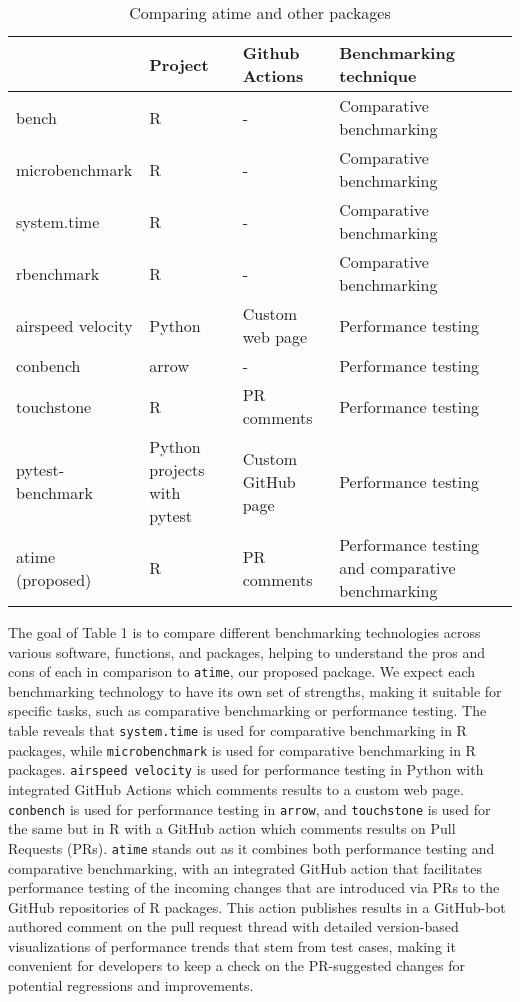 \begin{table}[H]
    \centering
        \caption{Comparing atime and other packages}
    \begin{tabular}{|m{2.6cm}|m{2cm}|m{3cm}|m{3cm}|m{4cm}|}
    \hline
         & Project & Github Actions & Benchmarking technique\\
\hline
bench & R  & - &  Comparative benchmarking \\

\hline
microbenchmark & R & - & Comparative benchmarking\\
\hline
system.time & R & - & Comparative benchmarking\\
\hline
rbenchmark & R & - & Comparative benchmarking\\
\hline
airspeed velocity & Python & Custom web page & Performance testing\\
\hline
conbench & arrow & - & Performance testing\\
\hline
touchstone & R & PR comments & Performance testing\\
\hline
pytest-benchmark & Python
projects with
pytest & Custom GitHub page & Performance testing\\
\hline
atime (proposed) & R & PR comments & Performance testing and comparative benchmarking\\
\hline
    \end{tabular}
    \label{tab:my_label}
\end{table}

\noindent The goal of Table 1 is to compare different benchmarking technologies across various software, functions, and packages, helping to understand the pros and cons of each in comparison to \texttt{atime}, our proposed package. We expect each benchmarking technology to have its own set of strengths, making it suitable for specific tasks, such as comparative benchmarking or performance testing. The table reveals that \texttt{system.time} is used for comparative benchmarking in R packages, while \texttt{microbenchmark} is used for comparative benchmarking in R packages. \texttt{airspeed velocity} is used for performance testing in Python with integrated GitHub Actions which comments results to a custom web page. \texttt{conbench} is used for performance testing in \texttt{arrow}, and \texttt{touchstone} is used for the same but in R with a GitHub action which comments results on Pull Requests (PRs). \texttt{atime} stands out as it combines both performance testing and comparative benchmarking, with an integrated GitHub action that facilitates performance testing of the incoming changes that are introduced via PRs to the GitHub repositories of R packages. This action publishes results in a GitHub-bot authored comment on the pull request thread with detailed version-based visualizations of performance trends that stem from test cases, making it convenient for developers to keep a check on the PR-suggested changes for potential regressions and improvements. \\

